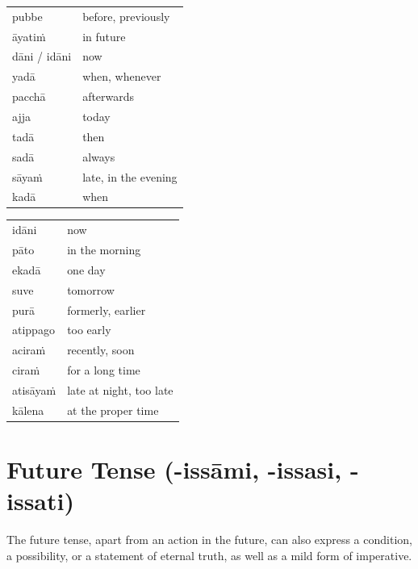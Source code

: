 \documentclass[11pt,oneside]{memoir}
\begin{document}
\begin{multicols}{2}

\begin{center}
\begin{tabular}{ll}
pubbe & before, previously\\[0pt]
āyatiṁ & in future\\[0pt]
dāni / idāni & now\\[0pt]
yadā & when, whenever\\[0pt]
pacchā & afterwards\\[0pt]
ajja & today\\[0pt]
tadā & then\\[0pt]
sadā & always\\[0pt]
sāyaṁ & late, in the evening\\[0pt]
kadā & when\\[0pt]
\end{tabular}
\end{center}

\columnbreak

\begin{center}
\begin{tabular}{ll}
idāni & now\\[0pt]
pāto & in the morning\\[0pt]
ekadā & one day\\[0pt]
suve & tomorrow\\[0pt]
purā & formerly, earlier\\[0pt]
atippago & too early\\[0pt]
aciraṁ & recently, soon\\[0pt]
ciraṁ & for a long time\\[0pt]
atisāyaṁ & late at night, too late\\[0pt]
kālena & at the proper time\\[0pt]
\end{tabular}
\end{center}

\end{multicols}

\section{Future Tense (-issāmi, -issasi, -issati)}
\label{sec:orgaa71edc}

The future tense, apart from an action in the future, can also express a
condition, a possibility, or a statement of eternal truth, as well as a mild
form of imperative.
\end{document}
